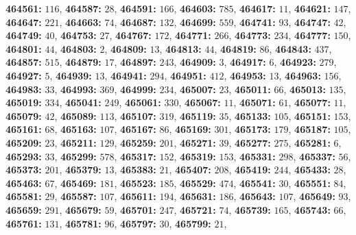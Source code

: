 \textsf{\bfseries 464561:} $116$, \textsf{\bfseries 464587:} $28$, \textsf{\bfseries 464591:} $166$, \textsf{\bfseries 464603:} $785$, \textsf{\bfseries 464617:} $11$, \textsf{\bfseries 464621:} $147$, \textsf{\bfseries 464647:} $221$, \textsf{\bfseries 464663:} $74$, \textsf{\bfseries 464687:} $132$, \textsf{\bfseries 464699:} $559$, \textsf{\bfseries 464741:} $93$, \textsf{\bfseries 464747:} $42$, \textsf{\bfseries 464749:} $40$, \textsf{\bfseries 464753:} $27$, \textsf{\bfseries 464767:} $172$, \textsf{\bfseries 464771:} $266$, \textsf{\bfseries 464773:} $234$, \textsf{\bfseries 464777:} $150$, \textsf{\bfseries 464801:} $44$, \textsf{\bfseries 464803:} $2$, \textsf{\bfseries 464809:} $13$, \textsf{\bfseries 464813:} $44$, \textsf{\bfseries 464819:} $86$, \textsf{\bfseries 464843:} $437$, \textsf{\bfseries 464857:} $515$, \textsf{\bfseries 464879:} $17$, \textsf{\bfseries 464897:} $243$, \textsf{\bfseries 464909:} $3$, \textsf{\bfseries 464917:} $6$, \textsf{\bfseries 464923:} $279$, \textsf{\bfseries 464927:} $5$, \textsf{\bfseries 464939:} $13$, \textsf{\bfseries 464941:} $294$, \textsf{\bfseries 464951:} $412$, \textsf{\bfseries 464953:} $13$, \textsf{\bfseries 464963:} $156$, \textsf{\bfseries 464983:} $33$, \textsf{\bfseries 464993:} $369$, \textsf{\bfseries 464999:} $234$, \textsf{\bfseries 465007:} $23$, \textsf{\bfseries 465011:} $66$, \textsf{\bfseries 465013:} $135$, \textsf{\bfseries 465019:} $334$, \textsf{\bfseries 465041:} $249$, \textsf{\bfseries 465061:} $330$, \textsf{\bfseries 465067:} $11$, \textsf{\bfseries 465071:} $61$, \textsf{\bfseries 465077:} $11$, \textsf{\bfseries 465079:} $42$, \textsf{\bfseries 465089:} $113$, \textsf{\bfseries 465107:} $319$, \textsf{\bfseries 465119:} $35$, \textsf{\bfseries 465133:} $105$, \textsf{\bfseries 465151:} $153$, \textsf{\bfseries 465161:} $68$, \textsf{\bfseries 465163:} $107$, \textsf{\bfseries 465167:} $86$, \textsf{\bfseries 465169:} $301$, \textsf{\bfseries 465173:} $179$, \textsf{\bfseries 465187:} $105$, \textsf{\bfseries 465209:} $23$, \textsf{\bfseries 465211:} $129$, \textsf{\bfseries 465259:} $201$, \textsf{\bfseries 465271:} $39$, \textsf{\bfseries 465277:} $275$, \textsf{\bfseries 465281:} $6$, \textsf{\bfseries 465293:} $33$, \textsf{\bfseries 465299:} $578$, \textsf{\bfseries 465317:} $152$, \textsf{\bfseries 465319:} $153$, \textsf{\bfseries 465331:} $298$, \textsf{\bfseries 465337:} $56$, \textsf{\bfseries 465373:} $201$, \textsf{\bfseries 465379:} $13$, \textsf{\bfseries 465383:} $21$, \textsf{\bfseries 465407:} $208$, \textsf{\bfseries 465419:} $244$, \textsf{\bfseries 465433:} $28$, \textsf{\bfseries 465463:} $67$, \textsf{\bfseries 465469:} $181$, \textsf{\bfseries 465523:} $185$, \textsf{\bfseries 465529:} $474$, \textsf{\bfseries 465541:} $30$, \textsf{\bfseries 465551:} $84$, \textsf{\bfseries 465581:} $29$, \textsf{\bfseries 465587:} $107$, \textsf{\bfseries 465611:} $194$, \textsf{\bfseries 465631:} $186$, \textsf{\bfseries 465643:} $107$, \textsf{\bfseries 465649:} $93$, \textsf{\bfseries 465659:} $291$, \textsf{\bfseries 465679:} $59$, \textsf{\bfseries 465701:} $247$, \textsf{\bfseries 465721:} $74$, \textsf{\bfseries 465739:} $165$, \textsf{\bfseries 465743:} $66$, \textsf{\bfseries 465761:} $131$, \textsf{\bfseries 465781:} $96$, \textsf{\bfseries 465797:} $30$, \textsf{\bfseries 465799:} $21$, 
